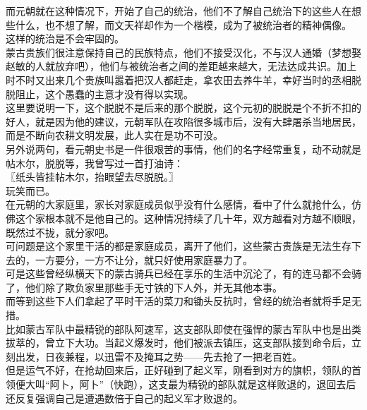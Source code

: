 \begin{multicols}{\theparacolNo}
而元朝就在这种情况下，开始了自己的统治，他们不了解自己统治下的这些人在想些什么，也不想了解，而文天祥却作为一个楷模，成为了被统治者的精神偶像。\\

这样的统治是不会牢固的。\\

蒙古贵族们很注意保持自己的民族特点，他们不接受汉化，不与汉人通婚（梦想娶赵敏的人就放弃吧），他们与被统治者之间的差距越来越大，无法达成共识。加上时不时又出来几个贵族叫嚣着把汉人都赶走，拿农田去养牛羊，幸好当时的丞相脱脱阻止，这个愚蠢的主意才没有得以实现。\\

这里要说明一下，这个脱脱不是后来的那个脱脱，这个元初的脱脱是个不折不扣的好人，就是因为他的建议，元朝军队在攻陷很多城市后，没有大肆屠杀当地居民，而是不断向农耕文明发展，此人实在是功不可没。\\

另外说两句，看元朝史书是一件很艰苦的事情，他们的名字经常重复，动不动就是帖木尔，脱脱等，我曾写过一首打油诗：\\

〖纸头皆挂帖木尔，抬眼望去尽脱脱。〗\\

玩笑而已。\\

在元朝的大家庭里，家长对家庭成员似乎没有什么感情，看中了什么就抢什么，仿佛这个家根本就不是他自己的。这种情况持续了几十年，双方越看对方越不顺眼，既然过不拢，就分家吧。\\

可问题是这个家里干活的都是家庭成员，离开了他们，这些蒙古贵族是无法生存下去的，一方要分，一方不让分，就只好使用家庭暴力了。\\

可是这些曾经纵横天下的蒙古骑兵已经在享乐的生活中沉沦了，有的连马都不会骑了，他们除了欺负家里那些手无寸铁的下人外，并无其他本事。\\

而等到这些下人们拿起了平时干活的菜刀和锄头反抗时，曾经的统治者就将手足无措。\\

比如蒙古军队中最精锐的部队阿速军，这支部队即使在强悍的蒙古军队中也是出类拔萃的，曾立下大功。当起义爆发时，他们被派去镇压，这支部队接到命令后，立刻出发，日夜兼程，以迅雷不及掩耳之势——先去抢了一把老百姓。\\

但是运气不好，在抢劫回来后，正好碰到了起义军，刚看到对方的旗帜，领队的首领便大叫“阿卜，阿卜”（快跑），这支最为精锐的部队就是这样败退的，退回去后还反复强调自己是遭遇数倍于自己的起义军才败退的。\\


\end{multicols}

